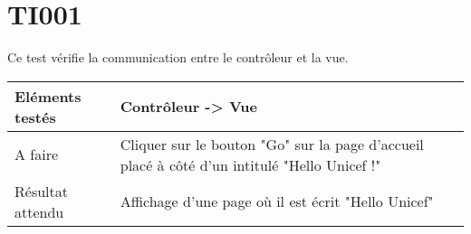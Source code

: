
\section{TI001}
	 Ce test vérifie la communication entre le contrôleur et la vue.
	 \begin{center}
     	\begin{tabular}[h]{|p{}|p{}|}
		\hline
			Eléments testés & Contrôleur -> Vue \\\hline
    			A faire & Cliquer sur le bouton "Go" sur la page d'accueil placé à côté d'un intitulé "Hello Unicef !" \\\hline
    			Résultat attendu & Affichage d'une page où il est écrit "Hello Unicef" \\\hline
     	\end{tabular}
  	\end{center}	